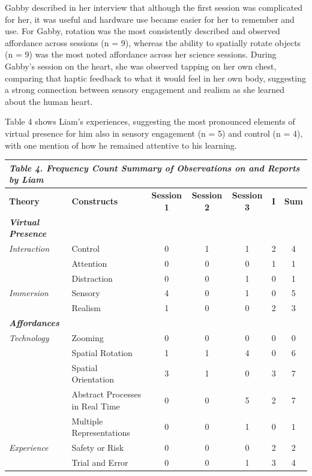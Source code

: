 \documentclass[11.5pt]{sig-alternate} %
\begin{document}
\begin{large}
Gabby described in her interview that although the first session was complicated for her, it was useful and hardware use became easier for her to remember and use. For Gabby, rotation was the most consistently described and observed affordance across sessions (n = 9), whereas the ability to spatially rotate objects (n = 9) was the most noted affordance across her science sessions. During Gabby’s session on the heart, she was observed tapping on her own chest, comparing that haptic feedback to what it would feel in her own body, suggesting a strong connection between sensory engagement and realism as she learned about the human heart. 
	
Table 4 shows Liam’s experiences, suggesting the most pronounced elements of virtual presence for him also in sensory engagement (n = 5) and control (n = 4), with one mention of how he remained attentive to his learning.  

\begin{table}
\begin{tabular}[h]{llccccc}
\hline
\multicolumn{7}{l}{\textit{\textbf{Table 4.} Frequency Count Summary of Observations on and Reports by Liam}} \\
\hline
\textbf{Theory} & \textbf{Constructs} & \textbf{Session 1} & \textbf{Session 2} & \textbf{Session 3} & \textbf{I} & \textbf{Sum} \\
\hline
\textit{\textbf{Virtual Presence}} & & & & & & \\
\textit{Interaction} & Control & 0 & 1 & 1 & 2 & 4 \\
 & Attention & 0 & 0 & 0 & 1 & 1 \\
 & Distraction & 0 & 0 & 1 & 0 & 1 \\
\textit{Immersion} & Sensory & 4 & 0 & 1 & 0 & 5 \\
 & Realism & 1 & 0 & 0 & 2 & 3 \\
\hline
\textit{\textbf{Affordances}} & & & & & & \\
\textit{Technology} & Zooming & 0 & 0 & 0 & 0 & 0 \\
 & Spatial Rotation & 1 & 1 & 4 & 0 & 6 \\
 & Spatial Orientation & 3 & 1 & 0 & 3 & 7 \\
 & Abstract Processes in Real Time & 0 & 0 & 5 & 2 & 7 \\
 & Multiple Representations & 0 & 0 & 1 & 0 & 1 \\
\textit{Experience} & Safety or Risk & 0 & 0 & 0 & 2 & 2 \\
 & Trial and Error & 0 & 0 & 1 & 3 & 4 \\
\hline
\end{tabular}
\end{table}
	

\end{large}
\end{document}
